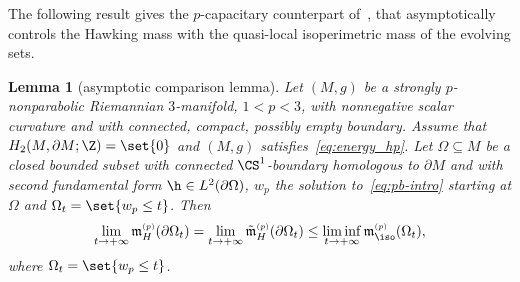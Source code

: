 \documentclass[10pt,a4paper]{amsart}
\numberwithin{equation}{section}
\newtheorem{Lemma}[Theorem]{Lemma}
\newcommand{\ma}{\mathfrak{m}}
\newcommand{\tp}[1][p]{{\text{\tiny$(#1)$}}}
\begin{document}
The following result gives the $p$-capacitary counterpart of~\cite[Lemma 2.7]{benatti_isoperimetricriemannianpenroseinequality_2022}, that asymptotically controls the Hawking mass with the quasi-local isoperimetric mass of the evolving sets.

\begin{Lemma}[asymptotic comparison lemma]\label{thm:mass_control_pcap}
Let $(M,g)$ be a strongly $p$-nonparabolic Riemannian $3$-manifold, $1<p<3$, with nonnegative scalar curvature and with connected, compact, possibly empty boundary. Assume that $H_2( M, \partial M; \Z)=\set{0}$ and $(M,g)$ satisfies~\eqref{eq:energy_hp}. Let $\Omega\subseteq M$ be a closed bounded subset with connected $\CS^1$-boundary homologous to $\partial M$ and with second fundamental form $\h \in L^2(\partial \Omega)$, $w_p$ the solution to~\eqref{eq:pb-intro} starting at $\Omega$ and $\Omega_t= \set{w_p \leq t}$. Then
\begin{equation}\label{eq:mass_contro_pcap}
 \lim_{t \to +\infty} \ma_{H}^{\tp}(\partial \Omega_t)= \lim_{t \to +\infty} \tilde{\ma}_{H}^{\tp}(\partial \Omega_t) \leq\liminf_{t \to +\infty} \ma_{\iso}^{\tp}(\Omega_t),
\end{equation}
where $\Omega_t= \set{ w_p \leq t}$.
\end{Lemma}
\end{document}
